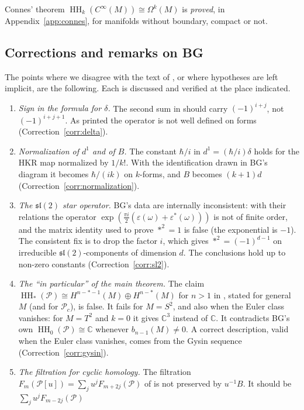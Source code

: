 \documentclass[11pt,oneside,reqno]{article}
\DeclareMathOperator{\HH}{HH}
\newcommand{\C}{\mathbb C}
\newcommand{\cP}{\mathcal P}
\newcommand{\CI}{C^\infty}
\newcommand{\Om}{\Omega}
\newcommand{\eps}{\varepsilon}
\newcommand{\hb}{\hbar}
\theoremstyle{plain}
\theoremstyle{definition}
\theoremstyle{remark}
\begin{document}
Connes' theorem \(\HH_k(\CI(M))\cong\Om^k(M)\) is \emph{proved}, in
Appendix~\ref{app:connes}, for manifolds without boundary, compact or not.

\subsection{Corrections and remarks on BG}\label{subsec:corrections}
The points where we disagree with the text of \cite{BG}, or where
hypotheses are left implicit, are the following. Each is discussed and
verified at the place indicated.
\begin{enumerate}
\item \emph{Sign in the formula for \(\delta\).} The second sum in
\cite[\S1, Thm.~(2), and \S2]{BG} should carry \((-1)^{i+j}\), not
\((-1)^{i+j+1}\). As printed the operator is not well defined on forms
(Correction~\ref{corr:delta}).
\item \emph{Normalization of \(d^1\) and of \(B\).} The constant
\(\hb/i\) in \(d^1=(\hb/i)\delta\) holds for the HKR map normalized by
\(1/k!\). With the identification drawn in BG's diagram it becomes
\(\hb/(ik)\) on \(k\)-forms, and \(B\) becomes \((k+1)d\)
(Correction~\ref{corr:normalization}).
\item \emph{The \(\mathfrak{sl}(2)\) star operator.} BG's data are internally
inconsistent: with their relations the operator
\(\exp(\frac{\pi i}2(\eps(\omega)+\eps^*(\omega)))\) is not of finite order, and the matrix
identity used to prove \(*^2=1\) is false (the exponential is \(-1\)). The consistent
fix is to drop the factor \(i\), which gives \(*^2=(-1)^{d-1}\) on irreducible
\(\mathfrak{sl}(2)\)-components of dimension \(d\). The conclusions hold up to non-zero
constants (Correction~\ref{corr:sl2}).
\item \emph{The ``in particular'' of the main theorem.} The claim
\(\HH_*(\cP)\cong H^{n-*-1}(M)\oplus H^{n-*}(M)\) for \(n>1\) in
\cite[\S4, Thm.~(1)]{BG}, stated for general \(M\) (and for \(\cP_c\)), is false. It
fails for \(M=S^2\), and also when the Euler class vanishes: for \(M=T^2\) and \(k=0\)
it gives \(\C^3\) instead of \(\C\). It contradicts BG's own \(\HH_0(\cP)\cong\C\) whenever
\(b_{n-1}(M)\ne0\). A correct description, valid when the Euler class vanishes, comes
from the Gysin sequence (Correction~\ref{corr:gysin}).
\item \emph{The filtration for cyclic homology.} The filtration
\(F_m(\cP[u])=\sum_ju^jF_{m+2j}(\cP)\) of \cite[\S4]{BG} is not preserved
by \(u^{-1}B\). It should be \(\sum_ju^jF_{m-2j}(\cP)\)

\end{enumerate}
\end{document}
